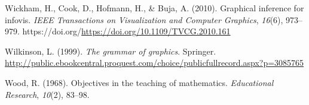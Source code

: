 \documentclass[
  10pt,
  letterpaper,
  DIV=11,
  numbers=noendperiod]{scrartcl}
\newlength{\cslhangindent}
\newenvironment{CSLReferences}[2] %
 {\begin{list}{}{%
  \setlength{\itemindent}{0pt}
  \setlength{\leftmargin}{0pt}
  \setlength{\parsep}{0pt}
  \ifodd #1
   \setlength{\leftmargin}{\cslhangindent}
   \setlength{\itemindent}{-1\cslhangindent}
  \fi
  \setlength{\itemsep}{#2\baselineskip}}}
 {\end{list}}
\begin{document}
\begin{CSLReferences}{1}{0}
Wickham, H., Cook, D., Hofmann, H., \& Buja, A. (2010). Graphical
inference for infovis. \emph{IEEE Transactions on Visualization and
Computer Graphics}, \emph{16}(6), 973--979.
https://doi.org/\url{https://doi.org/10.1109/TVCG.2010.161}

Wilkinson, L. (1999). \emph{The grammar of graphics}. Springer.
\url{http://public.ebookcentral.proquest.com/choice/publicfullrecord.aspx?p=3085765}

Wood, R. (1968). Objectives in the teaching of mathematics.
\emph{Educational Research}, \emph{10}(2), 83--98.

\end{CSLReferences}
\end{document}
